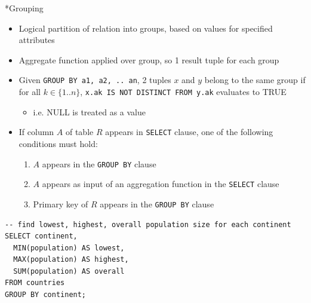 \documentclass[a4paper]{article}
\makeatletter
\renewcommand{\subsection}{
  \@startsection{subsection}{2}{0pt}{1ex}{1.2ex} {\raggedleft\normalfont\normalsize\bfseries\fbox}}
\newcommand{\ic}[1]{\lstinline{#1}}
\makeatother
\begin{document}
\begin{multicols*}{3}
  \subsection*{Grouping}
    \begin{itemize}[leftmargin=*]
      \item Logical partition of relation into groups, based on values for specified attributes
      \item Aggregate function applied over group, so 1 result tuple for each group
      \item Given \ic{GROUP BY a1, a2, .. an}, 2 tuples $x$ and $y$ belong to the same group if for all $k \in \{1 .. n\}$, \ic{x.ak IS NOT DISTINCT FROM y.ak} evaluates to TRUE
        \begin{itemize}[leftmargin=*]
          \item i.e. NULL is treated as a value
        \end{itemize}
      \item If column $A$ of table $R$ appears in \ic{SELECT} clause, one of the following conditions must hold:
        \begin{enumerate}[leftmargin=*]
          \item $A$ appears in the \ic{GROUP BY} clause
          \item $A$ appears as input of an aggregation function in the \ic{SELECT} clause
          \item Primary key of $R$ appears in the \ic{GROUP BY} clause
        \end{enumerate}
    \end{itemize}
    \begin{lstlisting}
-- find lowest, highest, overall population size for each continent
SELECT continent,
  MIN(population) AS lowest,
  MAX(population) AS highest,
  SUM(population) AS overall
FROM countries
GROUP BY continent;
    \end{lstlisting}

\end{multicols*}
\end{document}
